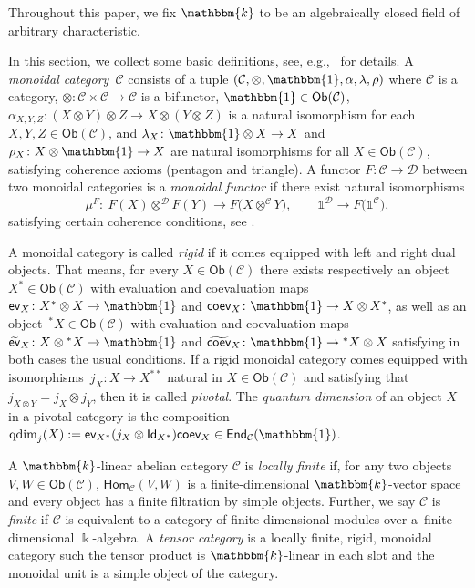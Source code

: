 \documentclass[pdftex]{sigma}
\numberwithin{equation}{section}
\newcommand{\coev}{\mathsf{coev}}
\newcommand{\coevr}{\widetilde{\mathsf{coev}}}
\newcommand{\ev}{\mathsf{ev}}
\newcommand{\evr}{\widetilde{\mathsf{ev}}}
\newcommand{\End}{\mathsf{End}}
\newcommand{\Hom}{\mathsf{Hom}}
\newcommand{\ide}{\mathsf{Id}}
\newcommand{\Ob}{\mathsf{Ob}}
\newcommand{\one}{\mathds{1}}
\newcommand{\cC}{\mathcal{C}}
\newcommand{\cD}{\mathcal{D}}
\begin{document}
Throughout this paper, we fix $\mathbbm{k}$ to be an algebraically closed field of arbitrary characteristic.

In this section, we collect some basic definitions, see, e.g.,~\cite{EGNO} for details. A \textit{monoidal category}~$\cC$ consists of a tuple $( \cC,\otimes, \mathbbm{1},\alpha,\lambda,\rho)$ where $\cC$ is a category, $\otimes \colon \cC \times \cC \to \cC$ is a bifunctor, $\mathbbm{1} \in \Ob (\cC)$, $\alpha_{X,Y,Z} \colon ( X \otimes Y) \otimes Z \to X \otimes ( Y \otimes Z)$ is a natural isomorphism for each $X, Y, Z \in \Ob (\cC)$, and $\lambda_X \colon \mathbbm{1} \otimes X \to X$ and $\rho_X \colon X \otimes \mathbbm{1} \to X$ are natural isomorphisms for all $X \in \Ob (\cC)$,
satisfying coherence axioms (pentagon and triangle).
A functor $F\colon \cC\to \cD$ between two monoidal categories is a \emph{monoidal functor} if there exist natural isomorphisms
\[\mu^F\colon\ F(X)\otimes^\cD F(Y)\to F\big(X\otimes^\cC Y\big), \qquad \one^\cD \to F\big(\one^\cC\big),\]
satisfying certain coherence conditions, see \cite[Definition~2.4.1]{EGNO}.

A monoidal category is called \textit{rigid} if it comes equipped with left and right dual objects. That means, for every $X \in \Ob (\cC)$ there exists respectively an object $X^* \in \Ob (\cC)$ with evaluation and coevaluation maps $\ev_X \colon X^* \otimes X \to \mathbbm{1}$ and $\coev_X \colon \mathbbm{1} \to X \otimes X^*$, as well as an object~${{}^*X \in \Ob (\cC)}$ with evaluation and coevaluation maps $\evr_X \colon X \otimes {}^*X \to \mathbbm{1}$ and $\coevr_X \colon \mathbbm{1} \to {}^*X \otimes X$ satisfying in both cases the usual conditions.
If a rigid monoidal category comes equipped with isomorphisms~$j_X \colon X \to X^{**}$ natural in $X \in \Ob(\cC)$ and satisfying that $j_{X \otimes Y}=j_X \otimes j_Y$, then it is called \textit{pivotal}. The \textit{quantum dimension} of an object $X$ in a pivotal category is the composition $\mathrm{qdim}_j (X):=\ev_{X^*} ( j_X \otimes \ide_{X^*} ) \coev_X \in \End_\cC ( \mathbbm{1} )$.

A $\mathbbm{k}$-linear abelian category $\cC$ is \textit{locally finite} if, for any two objects $V,W \in \Ob (\cC)$, $\Hom_\cC ( V,W)$ is a finite-dimensional $\mathbbm{k}$-vector space and every object has a finite filtration by simple objects. Further, we say $\cC$ is \textit{finite} if $\cC$ is equivalent to a category of finite-dimensional modules over a~finite-dimensional $\Bbbk$-algebra. A \textit{tensor category} is a locally finite, rigid, monoidal category such the tensor product is $\mathbbm{k}$-linear in each slot and the monoidal unit is a simple object of the category.
\end{document}
